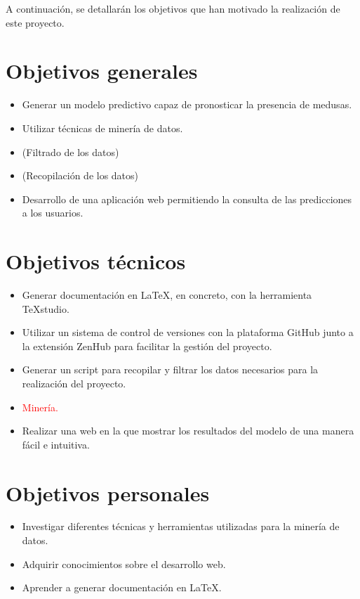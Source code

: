 

A continuación, se detallarán los objetivos que han motivado la realización de este proyecto.

\section{Objetivos generales}
\begin{itemize}
	
	\item Generar un modelo predictivo capaz de pronosticar la  presencia de medusas.
	\item Utilizar técnicas de minería de datos.
	\item (Filtrado de los datos)
	\item (Recopilación de los datos)
	\item Desarrollo de una aplicación web permitiendo la consulta de las predicciones a los usuarios.
\end{itemize}

\section{Objetivos técnicos}
\begin{itemize}
	\item Generar documentación en \LaTeX, en concreto, con la herramienta \TeX studio.
	\item Utilizar un sistema de control de versiones con la plataforma GitHub junto a la extensión ZenHub para facilitar la gestión del proyecto.
	\item Generar un script para recopilar y filtrar los datos necesarios para la realización del proyecto.
	\item \textcolor{red}{Minería.}
	\item Realizar una web en la que mostrar los resultados del modelo de una manera fácil e intuitiva.
\end{itemize}

\section{Objetivos personales}
\begin{itemize}
	\item Investigar diferentes técnicas y herramientas utilizadas para la minería de datos.
	\item Adquirir conocimientos sobre el desarrollo web.
	\item Aprender a generar documentación en \LaTeX.
	
\end{itemize}